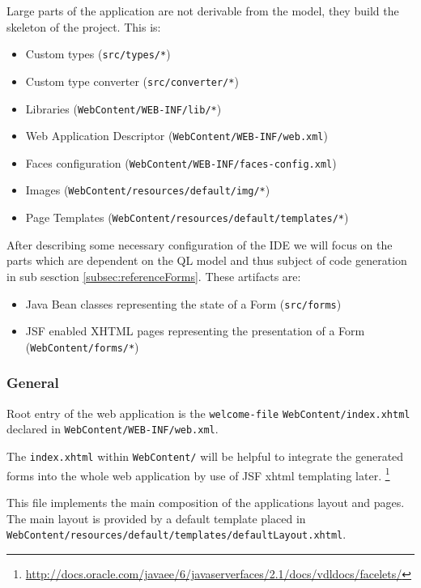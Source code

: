 Large parts of the application are not derivable from the model, they build the skeleton of the project. This is:
\begin{itemize}
\item Custom types (\texttt{src/types/*})
\item Custom type converter (\texttt{src/converter/*})
\item Libraries \newline (\texttt{WebContent/WEB-INF/lib/*})
\item Web Application Descriptor \newline (\texttt{WebContent/WEB-INF/web.xml})
\item Faces configuration \newline
(\texttt{WebContent/WEB-INF/faces-config.xml})
\item Images \newline (\texttt{WebContent/resources/default/img/*})
\item Page Templates \newline
(\texttt{WebContent/resources/default/templates/*})
\end{itemize} 

After describing some necessary configuration of the IDE we will focus on the
parts which are dependent on the QL model and thus subject of code generation
in sub sesction \ref{subsec:referenceForms}.
These artifacts are:
\begin{itemize}
\item Java Bean classes representing the state of a Form (\texttt{src/forms})
\item JSF enabled XHTML pages representing the presentation of a Form (\texttt{WebContent/forms/*})
\end{itemize}

\subsubsection{General}
\label{subsec:referenceGeneral}
Root entry of the web application is the \texttt{welcome-file}
\texttt{WebContent/index.xhtml} declared in \texttt{WebContent/WEB-INF/web.xml}.

The \texttt{index.xhtml} within \texttt{WebContent/} will be helpful to
integrate the generated forms into the whole web application by use of JSF xhtml
templating later.
\footnote{\url{http://docs.oracle.com/javaee/6/javaserverfaces/2.1/docs/vdldocs/facelets/}}
 
This file implements the main composition of the applications layout and
pages. The main layout is provided by a default template placed in
\texttt{WebContent/resources/default/templates/defaultLayout.xhtml}.

